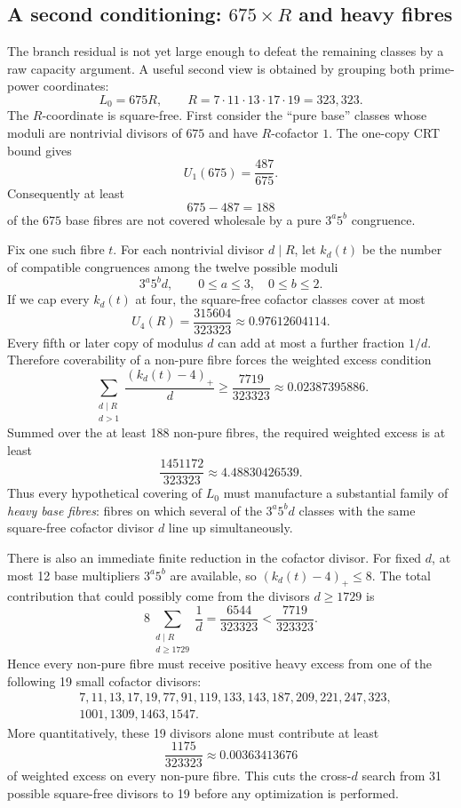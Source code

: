 \documentclass[11pt]{article}
\theoremstyle{definition}
\begin{document}
\subsection{A second conditioning: $675\times R$ and heavy fibres}

The branch residual is not yet large enough to defeat the remaining classes by a raw capacity
argument.  A useful second view is obtained by grouping both prime-power coordinates:
\[
 L_0=675R,\qquad
 R=7\cdot11\cdot13\cdot17\cdot19=323{,}323.
\]
The $R$-coordinate is square-free.  First consider the ``pure base'' classes whose moduli are
nontrivial divisors of $675$ and have $R$-cofactor $1$.  The one-copy CRT bound gives
\[
 U_1(675)=\frac{487}{675}.
\]
Consequently at least
\[
 675-487=188
\]
of the $675$ base fibres are not covered wholesale by a pure $3^a5^b$ congruence.

Fix one such fibre $t$.  For each nontrivial divisor $d\mid R$, let $k_d(t)$ be the number of
compatible congruences among the twelve possible moduli
\[
 3^a5^b d,\qquad 0\le a\le3,\quad0\le b\le2.
\]
If we cap every $k_d(t)$ at four, the square-free cofactor classes cover at most
\[
 U_4(R)=\frac{315604}{323323}\approx0.97612604114.
\]
Every fifth or later copy of modulus $d$ can add at most a further fraction $1/d$.  Therefore
coverability of a non-pure fibre forces the weighted excess condition
\begin{equation}\label{eq:heavy-fibre}
 \boxed{
 \sum_{\substack{d\mid R\\d>1}}
 \frac{(k_d(t)-4)_+}{d}
 \ge
 \frac{7719}{323323}
 \approx0.02387395886.}
\end{equation}
Summed over the at least 188 non-pure fibres, the required weighted excess is at least
\[
 \frac{1451172}{323323}\approx4.48830426539.
\]
Thus every hypothetical covering of $L_0$ must manufacture a substantial family of
\emph{heavy base fibres}: fibres on which several of the $3^a5^b d$ classes with the same
square-free cofactor divisor $d$ line up simultaneously.

There is also an immediate finite reduction in the cofactor divisor.  For fixed $d$, at most
12 base multipliers $3^a5^b$ are available, so $(k_d(t)-4)_+\le8$.  The total contribution that
could possibly come from the divisors $d\ge1729$ is
\[
 8\sum_{\substack{d\mid R\\d\ge1729}}\frac1d
 =\frac{6544}{323323}
 <\frac{7719}{323323}.
\]
Hence every non-pure fibre must receive positive heavy excess from one of the following 19
small cofactor divisors:
\[
\begin{split}
&7,11,13,17,19,77,91,119,133,143,187,209,221,247,323,\\
&1001,1309,1463,1547.
\end{split}
\]
More quantitatively, these 19 divisors alone must contribute at least
\[
 \frac{1175}{323323}\approx0.00363413676
\]
of weighted excess on every non-pure fibre.  This cuts the cross-$d$ search from 31 possible
square-free divisors to 19 before any optimization is performed.
\end{document}
